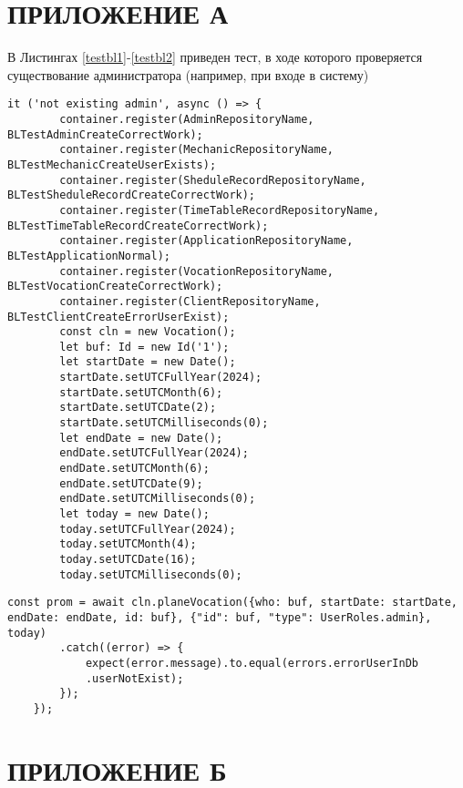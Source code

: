 \chapter*{ПРИЛОЖЕНИЕ  А}\label{chp:Appendix1}

\setcounter{lstlisting}{0}

\renewcommand\thelstlisting{А.\arabic{lstlisting}}

В Листингах \ref{testbl1}-\ref{testbl2} приведен тест, в ходе которого проверяется существование администратора (например, при входе в систему)

\begin{lstlisting}[label=testbl1, style=mystyle, caption={Тест, в ходе которого проверяется существование администратора (например, при входе в систему) (ч. 1)}]
	it ('not existing admin', async () => {
		container.register(AdminRepositoryName, BLTestAdminCreateCorrectWork);
		container.register(MechanicRepositoryName, BLTestMechanicCreateUserExists);
		container.register(SheduleRecordRepositoryName, BLTestSheduleRecordCreateCorrectWork);
		container.register(TimeTableRecordRepositoryName, BLTestTimeTableRecordCreateCorrectWork);
		container.register(ApplicationRepositoryName, BLTestApplicationNormal);
		container.register(VocationRepositoryName, BLTestVocationCreateCorrectWork);
		container.register(ClientRepositoryName, BLTestClientCreateErrorUserExist);
		const cln = new Vocation();
		let buf: Id = new Id('1');
		let startDate = new Date();
		startDate.setUTCFullYear(2024);
		startDate.setUTCMonth(6);
		startDate.setUTCDate(2);
		startDate.setUTCMilliseconds(0);
		let endDate = new Date();
		endDate.setUTCFullYear(2024);
		endDate.setUTCMonth(6);
		endDate.setUTCDate(9);
		endDate.setUTCMilliseconds(0);
		let today = new Date();
		today.setUTCFullYear(2024);
		today.setUTCMonth(4);
		today.setUTCDate(16);
		today.setUTCMilliseconds(0);
\end{lstlisting}
\newpage
\begin{lstlisting}[label=testbl2, style=mystyle, caption={Тест, в ходе которого проверяется существование администратора (например, при входе в систему) (ч. 2)}]
		const prom = await cln.planeVocation({who: buf, startDate: startDate, endDate: endDate, id: buf}, {"id": buf, "type": UserRoles.admin}, today)
		.catch((error) => {
			expect(error.message).to.equal(errors.errorUserInDb
			.userNotExist);
		});
	});
\end{lstlisting}

\chapter*{ПРИЛОЖЕНИЕ  Б}\label{chp:Appendix2}

